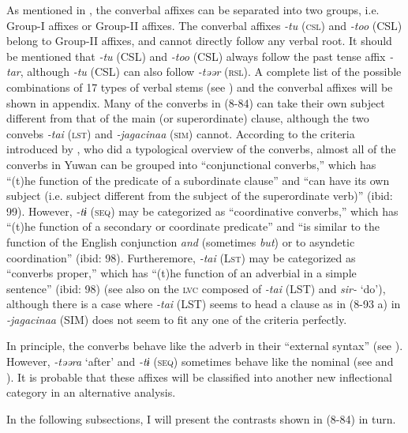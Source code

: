 As mentioned in , the converbal affixes can be separated into two groups, i.e. Group-I affixes or Group-II affixes. The converbal affixes \textit{{}-tu} (\textsc{csl}) and \textit{{}-too} (CSL) belong to Group-II affixes, and cannot directly follow any verbal root. It should be mentioned that \textit{{}-tu} (CSL) and \textit{{}-too} (CSL) always follow the past tense affix \textit{{}-tar}, although \textit{{}-tu} (CSL) can also follow \textit{{}-təər} (\textsc{rsl}). A complete list of the possible combinations of 17 types of verbal stems (see ) and the converbal affixes will be shown in appendix. Many of the converbs in (8-84) can take their own subject different from that of the main (or superordinate) clause, although the two convebs \textit{{}-tai} (\textsc{lst}) and \textit{{}-jagacinaa} (\textsc{sim}) cannot. According to the criteria introduced by \citet[98-99]{Nedjalkov1995}, who did a typological overview of the converbs, almost all of the converbs in Yuwan can be grouped into “conjunctional converbs,” which has “(t)he function of the predicate of a subordinate clause” and “can have its own subject (i.e. subject different from the subject of the superordinate verb)” (ibid: 99). However, \textit{{}-tɨ} (\textsc{seq}) may be categorized as “coordinative converbs,” which has “(t)he function of a secondary or coordinate predicate” and “is similar to the function of the English conjunction \textit{and} (sometimes \textit{but}) or to asyndetic coordination” (ibid: 98). Furtheremore, \textit{{}-tai} (L\textsc{st}) may be categorized as “converbs proper,” which has “(t)he function of an adverbial in a simple sentence” (ibid: 98) (see also  on the \textsc{lvc} composed of \textit{{}-tai} (LST) and \textit{sir-} ‘do’), although there is a case where \textit{{}-tai} (LST) seems to head a clause as in (8-93 a) in  \textit{{}-jagacinaa} (SIM) does not seem to fit any one of the criteria perfectly.

  In principle, the converbs behave like the adverb in their “external syntax” (see ). However, \textit{{}-təəra} ‘after’ and \textit{{}-tɨ} (\textsc{seq}) sometimes behave like the nominal (see  and ). It is probable that these affixes will be classified into another new inflectional category in an alternative analysis.

In the following subsections, I will present the contrasts shown in (8-84) in turn.

